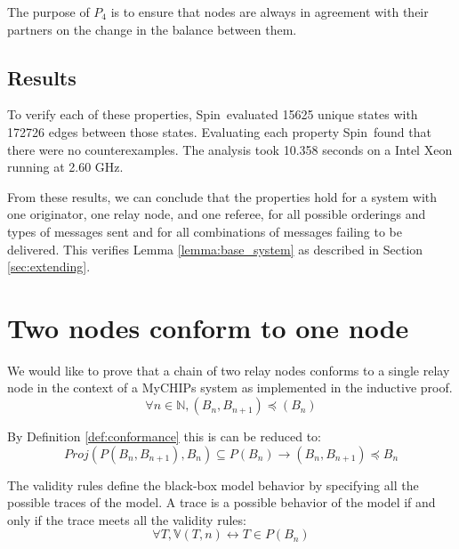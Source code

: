 \documentclass[runningheads]{llncs}
\newcommand{\actsvalid}[2]{\mathds{V}(#1, #2)}
\newcommand{\projalpha}[2]{\mathit{Proj}(#1, #2)}
\newcommand{\secref}[1]{Section \ref{#1}}
\newcommand{\spin}{Spin}
\begin{document}
The purpose of $P_4$ is to ensure that nodes are always in agreement with their partners on the change in the balance between them. 



\subsection{Results}

To verify each of these properties, \spin\ evaluated 
15625 unique states with 172726 edges between those states. Evaluating each property \spin\ found that there were no counterexamples. The analysis took 10.358 seconds on a Intel Xeon running at 2.60 GHz.

From these results, we can conclude that the properties hold for a system with one originator, one relay node, and one referee, for all possible orderings and types of messages sent and for all combinations of messages failing to be delivered. This verifies Lemma \ref{lemma:base_system} as described in \secref{sec:extending}.


\section{Two nodes conform to one node}
\label{chap:coq_results}

We would like to prove that a chain of two relay nodes conforms to a single relay node in the context of a MyCHIPs system as implemented in the inductive proof.
$$\forall n \in \mathds{N}, (B_n, B_{n+1}) \preceq (B_n)
$$

By Definition \ref{def:conformance} this is can be reduced to:
$$\projalpha{P(B_n, B_{n+1})}{B_n} \subseteq P(B_n) \longrightarrow (B_n, B_{n+1}) \preceq B_n$$

The validity rules define the black-box model behavior by specifying all the possible traces of the model. A trace is a possible behavior of the model if and only if the trace meets all the validity rules:
\begin{equation}
\label{eq:valid_implies}
\forall T, \actsvalid{T}{n} \leftrightarrow
 T \in P(B_n)
\end{equation}
\end{document}
